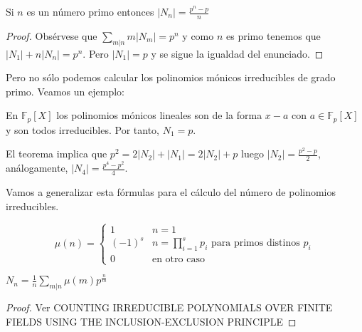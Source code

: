 \begin{corollary}
	Si $n$ es un número primo entonces $|N_n| = \frac{p^n-p}{n}$
\end{corollary}
\begin{proof}
	Obsérvese que $\sum_{m|n} m |N_m| = p^n$ y como $n$ es primo tenemos que $|N_1| + n|N_n| = p^n$. Pero $|N_1| = p$ y se sigue la igualdad del enunciado. 
\end{proof}

Pero no sólo podemos calcular los polinomios mónicos irreducibles de grado primo. Veamos un ejemplo:

\begin{example}
	En $\mathbb{F}_p[X]$ los polinomios mónicos lineales son de la forma $x-a$ con $a \in \mathbb{F}_p[X]$ y son todos irreducibles. Por tanto, $N_1 = p$.
	
	El teorema implica que $p^2 = 2 |N_2| + |N_1| = 2 |N_2| + p$ luego $|N_2| = \frac{p^2 - p}{2}$, análogamente, $|N_4| = \frac{p^4 - p^2}{4}$.
\end{example}

Vamos a generalizar esta fórmulas para el cálculo del número de polinomios irreducibles. 

\begin{definition}
	\[
	\mu(n) = 
	\begin{cases} 
	1 & n = 1 \\
	(-1)^s & n = \prod_{i = 1}^s p_i  \text{ para primos distinos } p_i \\
	0   & \text{en otro caso}
	\end{cases}
	\]
\end{definition}


\begin{theorem}
	$N_n = \frac{1}{n} \sum_{m|n} \mu(m) p^{\frac{n}{m}}$
\end{theorem}
\begin{proof}
	Ver COUNTING IRREDUCIBLE POLYNOMIALS OVER FINITE
	FIELDS USING THE INCLUSION-EXCLUSION PRINCIPLE
\end{proof}




